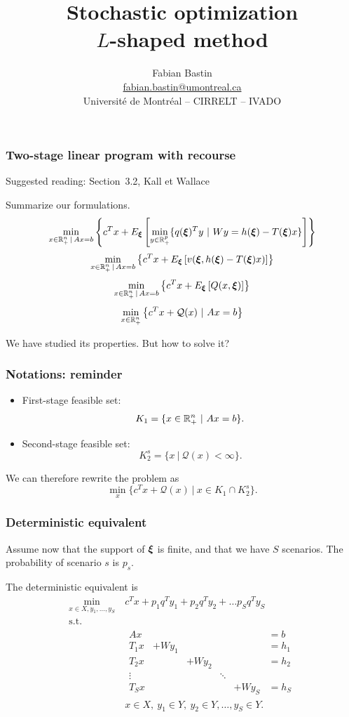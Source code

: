 \documentclass{beamer}
\author[Fabian Bastin]{Fabian Bastin \\ \url{fabian.bastin@umontreal.ca} \\ Université de Montréal -- CIRRELT -- IVADO}
\date{}
\title[$L$-shaped method]{Stochastic optimization\\$L$-shaped method}
\begin{document}
\frame{\titlepage}

\begin{frame}
\frametitle{Two-stage linear program with recourse}

{\red Suggested reading: Section~3.2, Kall et Wallace}

\mbox{}

Summarize our formulations.
\[
\min_{x \in {\mathbb{R}}^n_+ \,|\, Ax = b} \left\lbrace c^Tx + E_{{\boldsymbol{\xi}}} \left[ \min_{y \in {\mathbb{R}}^p_+} \lbrace q({\boldsymbol{\xi}})^Ty \ |\ Wy = h({\boldsymbol{\xi}}) - T({\boldsymbol{\xi}})x \rbrace \right] \right\rbrace 
\]
\[
\min_{x \in {\mathbb{R}}^n_+ \,|\, Ax = b} \left\lbrace c^Tx + E_{{\boldsymbol{\xi}}}
  \left[  v({\boldsymbol{\xi}}, h({\boldsymbol{\xi}})-T({\boldsymbol{\xi}})x) \right] \right\rbrace 
\]
\[
\min_{x \in {\mathbb{R}}^n_+ \,|\, Ax = b} \left\lbrace c^Tx + E_{{\boldsymbol{\xi}}} \left[ Q(x,{\boldsymbol{\xi}}) \right] \right\rbrace 
\]
\[
\min_{x \in {\mathbb{R}}^n_+} \left\lbrace c^Tx + \mathcal{Q}(x)
  \ |\ Ax = b \right\rbrace 
\]

We have studied its properties. But how to solve it?

\end{frame}

\begin{frame}
\frametitle{Notations: reminder}

\begin{itemize}
\item
First-stage feasible set:
\[
K_1 = \lbrace x \in {\mathbb{R}}^n_+ \ |\ Ax = b \rbrace.
\]
\item
Second-stage feasible set:
\[
K_2^s = \lbrace x \ |\ \mathcal{Q}(x) < \infty \rbrace.
\]
\end{itemize}
We can therefore rewrite the problem as
\[
\min_x \lbrace c^Tx + \mathcal{Q}(x) \ |\ x \in K_1 \cap K_2^s \rbrace.
\]



\end{frame}

\begin{frame}
\frametitle{Deterministic equivalent}

Assume now that the support of ${\boldsymbol{\xi}}$ is finite, and that we have $S$ scenarios.
The probability of scenario $s$ is $p_s$.

\mbox{}

The deterministic equivalent is
\begin{align*}
\min_{x \in X, y_1, \ldots, y_S}\ & c^T x + p_1 q^T y_1 + p_2 q^T y_2 + \ldots
p_S q^Ty_S \\
\mbox{s.t. } & \\
& \begin{matrix} Ax & & & & & = b\\
T_1 x & + W y_1 & & & & = h_1 \\
T_2 x & & + W y_2 & & & = h_2 \\
\vdots & & & \ddots & \\
T_S x & & & & + W y_S & = h_S
\end{matrix} \\
& x \in X,\ y_1 \in Y,\ y_2 \in Y,\ldots, y_S \in Y.
\end{align*}

\end{frame}
\end{document}
